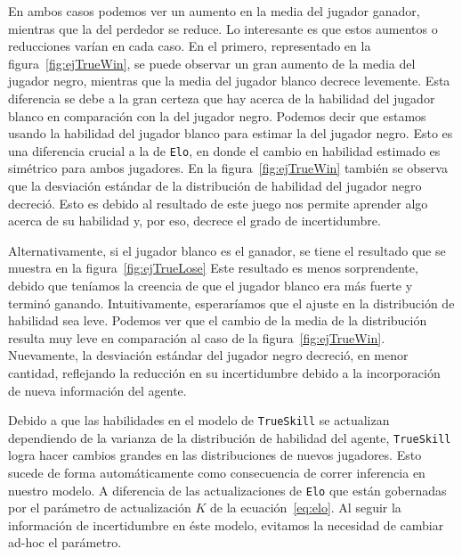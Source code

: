 \documentclass[11pt,twoside,spanish]{report} %
\begin{document}
En ambos casos podemos ver  un aumento en la media del jugador ganador, mientras que la del perdedor se reduce.
Lo interesante es que estos aumentos o reducciones var\'ian en cada caso.
En el primero, representado en la figura~\ref{fig:ejTrueWin}, se puede observar un gran aumento de la media del jugador negro, mientras que la media del jugador blanco decrece levemente.
Esta diferencia se debe a la gran certeza que hay acerca de la habilidad del jugador blanco en comparaci\'on con la del jugador negro.
Podemos decir que estamos usando la habilidad del jugador blanco para estimar la del jugador negro.
Esto es una diferencia crucial a la de \texttt{Elo}, en donde el cambio en habilidad estimado es sim\'etrico para ambos jugadores.
En la figura~\ref{fig:ejTrueWin} tambi\'en se observa que la desviaci\'on est\'andar de la distribuci\'on de habilidad del jugador negro decreci\'o.
Esto es debido al resultado de este juego nos permite aprender algo acerca de su habilidad y, por eso, decrece el grado de incertidumbre.

Alternativamente, si el jugador blanco es el ganador, se tiene el resultado que se muestra en la figura~\ref{fig:ejTrueLose}
Este resultado es menos sorprendente, debido que ten\'iamos la creencia de que el jugador blanco era m\'as fuerte y termin\'o ganando.
Intuitivamente, esperar\'iamos que el ajuste en la distribuci\'on de habilidad sea leve.
Podemos ver que el cambio de la media de la distribuci\'on resulta muy leve en comparaci\'on al caso de la figura~\ref{fig:ejTrueWin}.
Nuevamente, la desviaci\'on est\'andar del jugador negro decreci\'o, en menor cantidad, reflejando la reducci\'on en su incertidumbre debido a la incorporaci\'on de nueva informaci\'on del agente.

Debido a que las habilidades en el modelo de \texttt{TrueSkill} se actualizan dependiendo de la varianza de la distribuci\'on de habilidad del agente, \texttt{TrueSkill} logra hacer cambios grandes en las distribuciones de nuevos jugadores.
Esto sucede de forma autom\'aticamente como consecuencia de correr inferencia en nuestro modelo.
A diferencia de las actualizaciones de \texttt{Elo} que est\'an gobernadas por el par\'ametro de actualizaci\'on $K$ de la ecuaci\'on~\ref{eq:elo}.
Al seguir la informaci\'on de incertidumbre en \'este modelo, evitamos la necesidad de cambiar ad-hoc el par\'ametro.
\end{document}
